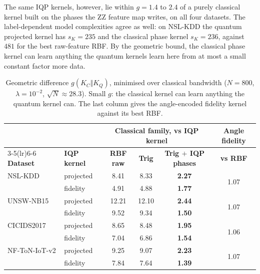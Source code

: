 The same IQP kernels, however, lie within $g=1.4$ to $2.4$ of a purely classical kernel built on the
phases the ZZ feature map writes, on all four datasets. The label-dependent model complexities agree as
well: on NSL-KDD the quantum projected kernel has $s_K=235$ and the classical phase kernel $s_K=236$,
against $481$ for the best raw-feature RBF. By the geometric bound, the classical phase kernel can learn
anything the quantum kernels learn here from at most a small constant factor more data.

\begin{table}[t]
\centering
\caption{Geometric difference $g(K_C\Vert K_Q)$, minimised over classical bandwidth
($N=800$, $\lambda=10^{-2}$, $\sqrt{N}\approx 28.3$). Small $g$: the classical kernel can learn anything
the quantum kernel can. The last column gives the angle-encoded fidelity kernel against its best RBF.}
\label{tab:geom}
\footnotesize
\renewcommand{\arraystretch}{1.15}
\setlength{\tabcolsep}{4pt}
\begin{tabular}{@{}llcccc@{}}
\toprule
& & \multicolumn{3}{c}{\textbf{Classical family, vs IQP kernel}} & \textbf{Angle fidelity}\\
\cmidrule(lr){3-5}\cmidrule(lr){6-6}
\textbf{Dataset} & \textbf{IQP kernel} & \textbf{RBF raw} & \textbf{Trig} & \textbf{Trig $+$ IQP phases} & \textbf{vs RBF}\\
\midrule
NSL-KDD       & projected & 8.41  & 8.33  & \textbf{2.27} & \multirow{2}{*}{1.07}\\
              & fidelity  & 4.91  & 4.88  & \textbf{1.77} & \\
UNSW-NB15     & projected & 12.21 & 12.10 & \textbf{2.44} & \multirow{2}{*}{1.07}\\
              & fidelity  & 9.52  & 9.34  & \textbf{1.50} & \\
CICIDS2017    & projected & 8.65  & 8.48  & \textbf{1.95} & \multirow{2}{*}{1.06}\\
              & fidelity  & 7.04  & 6.86  & \textbf{1.54} & \\
NF-ToN-IoT-v2 & projected & 9.25  & 9.07  & \textbf{2.23} & \multirow{2}{*}{1.07}\\
              & fidelity  & 7.84  & 7.64  & \textbf{1.39} & \\
\bottomrule
\end{tabular}
\end{table}

